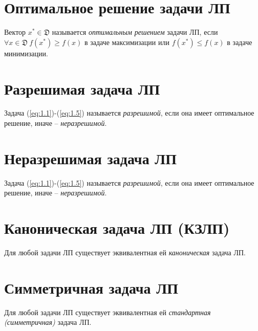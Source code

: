 \section{Оптимальное решение задачи ЛП}

\begin{definition}
	Вектор $x^{*} \in \mathfrak{D}$ называется \emph{оптимальным решением} задачи ЛП, если $\forall x \in \mathfrak{D} \ f(x^{*}) \geqslant f(x)$ в задаче максимизации или $f(x^{*}) \leqslant f(x)$ в задаче минимизации.
\end{definition}

\newpage

\section{Разрешимая задача ЛП}

\begin{definition}
	Задача (\ref{eq:1.1})-(\ref{eq:1.5}) называется \emph{разрешимой}, если она имеет оптимальное решение, иначе -- \emph{неразрешимой}.
\end{definition}

\section{Неразрешимая задача ЛП}

\begin{definition}
	Задача (\ref{eq:1.1})-(\ref{eq:1.5}) называется \emph{разрешимой}, если она имеет оптимальное решение, иначе -- \emph{неразрешимой}.
\end{definition}

\section{Каноническая задача ЛП (КЗЛП)}

\begin{theorem}
	Для любой задачи ЛП существует эквивалентная ей \emph{каноническая} задача ЛП.
\end{theorem}

\section{Симметричная задача ЛП}

\begin{theorem}
	Для любой задачи ЛП существует эквивалентная ей \emph{стандартная (симметричная)} задача ЛП.
\end{theorem}

